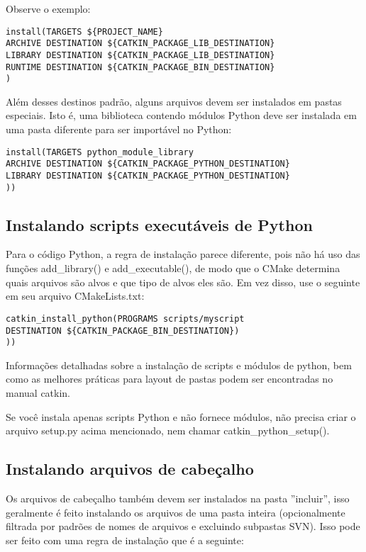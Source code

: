 Observe o exemplo:

\begin{verbatim}
install(TARGETS ${PROJECT_NAME}
ARCHIVE DESTINATION ${CATKIN_PACKAGE_LIB_DESTINATION}
LIBRARY DESTINATION ${CATKIN_PACKAGE_LIB_DESTINATION}
RUNTIME DESTINATION ${CATKIN_PACKAGE_BIN_DESTINATION}
)\end{verbatim}



Além desses destinos padrão, alguns arquivos devem ser instalados em pastas especiais. Isto é, uma biblioteca contendo módulos Python deve ser instalada em uma pasta diferente para ser importável no Python:

\begin{verbatim}
install(TARGETS python_module_library
ARCHIVE DESTINATION ${CATKIN_PACKAGE_PYTHON_DESTINATION}
LIBRARY DESTINATION ${CATKIN_PACKAGE_PYTHON_DESTINATION}
))\end{verbatim}


\subsection{Instalando scripts executáveis de Python}

Para o código Python, a regra de instalação parece diferente, pois não há uso das funções add\_library() e add\_executable(), de modo que o CMake determina quais arquivos são alvos e que tipo de alvos eles são. Em vez disso, use o seguinte em seu arquivo CMakeLists.txt:

\begin{verbatim}
catkin_install_python(PROGRAMS scripts/myscript
DESTINATION ${CATKIN_PACKAGE_BIN_DESTINATION})
))\end{verbatim}


Informações detalhadas sobre a instalação de scripts e módulos de python, bem como as melhores práticas para layout de pastas podem ser encontradas no manual catkin.

Se você instala apenas scripts Python e não fornece módulos, não precisa criar o arquivo setup.py acima mencionado, nem chamar catkin\_python\_setup().

\subsection{Instalando arquivos de cabeçalho}

Os arquivos de cabeçalho também devem ser instalados na pasta ''incluir'', isso geralmente é feito instalando os arquivos de uma pasta inteira (opcionalmente filtrada por padrões de nomes de arquivos e excluindo subpastas SVN). Isso pode ser feito com uma regra de instalação que é a seguinte:

